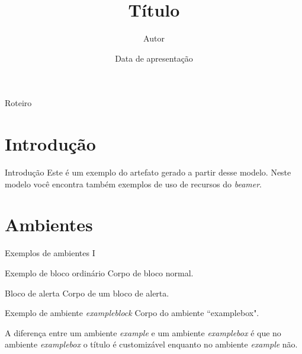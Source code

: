 \documentclass[darkblue]{beamer}
\title{Título}
\author{Autor}
\institute[] %
{
	\inst{}
	Departamento de Ciência da Computação\\
	Instituto de Ciências Matématicas e de Computação\\
	Universidade de São Paulo
}
\date{Data de apresentação}
\begin{document}
	\label{Título}
	
	\begin{frame}
		
		\titlepage
	\end{frame}
	
	\begin{frame}[allowframebreaks]{Roteiro} %
		\tableofcontents
	\end{frame}
	
	\section{Introdução}
		\begin{frame}{Introdução}
			Este é um exemplo do artefato gerado a partir desse modelo. Neste modelo você encontra
			 também exemplos de uso de recursos do \textit{beamer}.
		\end{frame}
	
	\label{amb1}	
	\section{Ambientes}
		\begin{frame}{Exemplos de ambientes I}
			\begin{block}{Exemplo de bloco ordinário}
				Corpo de bloco normal.
			\end{block}
			
			\begin{alertblock}{Bloco de alerta}
				Corpo de um bloco de alerta.
			\end{alertblock}
			
			\begin{exampleblock}{Exemplo de ambiente \textit{exampleblock}}
				Corpo do ambiente ``examplebox".
			\end{exampleblock}
			
			\begin{example}
				A diferença entre um ambiente \textit{example} e um ambiente \textit{examplebox} é que
				no ambiente \textit{examplebox} o título é customizável enquanto no ambiente \textit{example} não. 
			\end{example}
			
		\end{frame}
		
\end{document}
